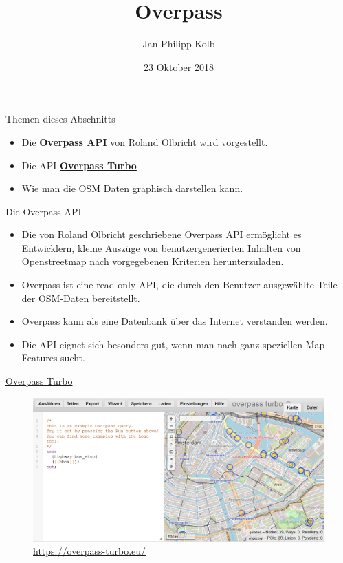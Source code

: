 \documentclass[ignorenonframetext,]{beamer}
\title{Overpass}
\author{Jan-Philipp Kolb}
\date{23 Oktober 2018}
\providecommand{\tightlist}{%
  \setlength{\itemsep}{0pt}\setlength{\parskip}{0pt}}
\begin{document}
\frame{\titlepage}

\begin{frame}{Themen dieses Abschnitts}
\protect\hypertarget{themen-dieses-abschnitts}{}

\begin{itemize}
\tightlist
\item
  Die
  \href{https://wiki.openstreetmap.org/wiki/Overpass_API}{\textbf{Overpass
  API}} von Roland Olbricht wird vorgestellt.
\item
  Die API \href{https://overpass-turbo.eu/}{\textbf{Overpass Turbo}}
\item
  Wie man die OSM Daten graphisch darstellen kann.
\end{itemize}

\end{frame}

\begin{frame}{Die Overpass API}
\protect\hypertarget{die-overpass-api}{}

\begin{itemize}
\tightlist
\item
  Die von Roland Olbricht geschriebene Overpass API ermöglicht es
  Entwicklern, kleine Auszüge von benutzergenerierten Inhalten von
  Openstreetmap nach vorgegebenen Kriterien herunterzuladen.
\item
  Overpass ist eine read-only API, die durch den Benutzer ausgewählte
  Teile der OSM-Daten bereitstellt.
\item
  Overpass kann als eine Datenbank über das Internet verstanden werden.
\item
  Die API eignet sich besonders gut, wenn man nach ganz speziellen Map
  Features sucht.
\end{itemize}

\end{frame}

\begin{frame}{\href{https://overpass-turbo.eu/}{Overpass Turbo}}
\protect\hypertarget{overpass-turbo}{}

\begin{figure}
\centering
\includegraphics{figure/overpassTurbo.PNG}
\caption{\url{https://overpass-turbo.eu/}}
\end{figure}

\end{frame}
\end{document}
